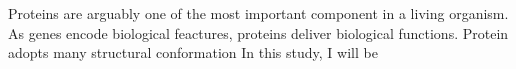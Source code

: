Proteins are arguably one of the most important component in a living organism. As genes encode biological feactures, proteins deliver biological functions. Protein adopts many structural conformation  In this study, I will be 